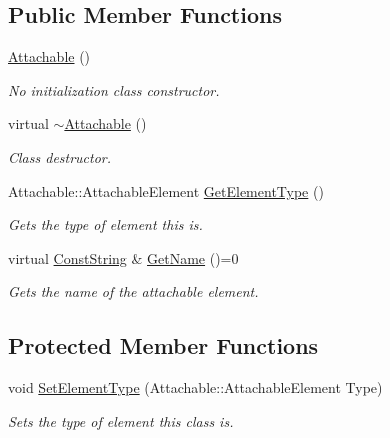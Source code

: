 \subsection*{Public Member Functions}
\begin{DoxyCompactItemize}
\item 
\hypertarget{classphys_1_1Attachable_a93c18f22769a1f70ae300fc2c58210eb}{
\hyperlink{classphys_1_1Attachable_a93c18f22769a1f70ae300fc2c58210eb}{Attachable} ()}
\label{df/dbd/classphys_1_1Attachable_a93c18f22769a1f70ae300fc2c58210eb}

\begin{DoxyCompactList}\small\item\em No initialization class constructor. \item\end{DoxyCompactList}\item 
\hypertarget{classphys_1_1Attachable_af7187e29053b7fe339634394883729d4}{
virtual \hyperlink{classphys_1_1Attachable_af7187e29053b7fe339634394883729d4}{$\sim$Attachable} ()}
\label{df/dbd/classphys_1_1Attachable_af7187e29053b7fe339634394883729d4}

\begin{DoxyCompactList}\small\item\em Class destructor. \item\end{DoxyCompactList}\item 
Attachable::AttachableElement \hyperlink{classphys_1_1Attachable_a5f747000367afd85dfaff3a37976e74c}{GetElementType} ()
\begin{DoxyCompactList}\small\item\em Gets the type of element this is. \item\end{DoxyCompactList}\item 
\hypertarget{classphys_1_1Attachable_a56d2f5a6f17c14ff0c1d9906d17b0f52}{
virtual \hyperlink{namespacephys_a5ce5049f8b4bf88d6413c47b504ebb31}{ConstString} \& \hyperlink{classphys_1_1Attachable_a56d2f5a6f17c14ff0c1d9906d17b0f52}{GetName} ()=0}
\label{df/dbd/classphys_1_1Attachable_a56d2f5a6f17c14ff0c1d9906d17b0f52}

\begin{DoxyCompactList}\small\item\em Gets the name of the attachable element. \item\end{DoxyCompactList}\end{DoxyCompactItemize}
\subsection*{Protected Member Functions}
\begin{DoxyCompactItemize}
\item 
void \hyperlink{classphys_1_1Attachable_a74361315eba9e4f0ce288518c92541fa}{SetElementType} (Attachable::AttachableElement Type)
\begin{DoxyCompactList}\small\item\em Sets the type of element this class is. \item\end{DoxyCompactList}\end{DoxyCompactItemize}
